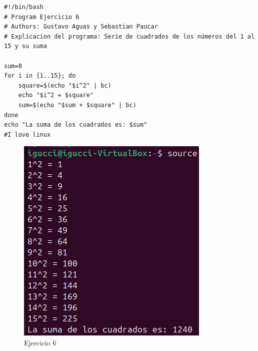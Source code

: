 \documentclass[11pt,twoside]{book}
\begin{document}
\begin{lstlisting}
#!/bin/bash
# Program Ejercicio 6
# Authors: Gustavo Aguas y Sebastian Paucar
# Explicacion del programa: Serie de cuadrados de los números del 1 al 15 y su suma

sum=0
for i in {1..15}; do
    square=$(echo "$i^2" | bc)
    echo "$i^2 = $square"
    sum=$(echo "$sum + $square" | bc)
done
echo "La suma de los cuadrados es: $sum"
#I love linux
\end{lstlisting}
\begin{figure}
    \centering
    \includegraphics[width=0.75\linewidth]{series/ej6.png}
    \caption{Ejercicio 6}
\end{figure}
\newpage
\end{document}
